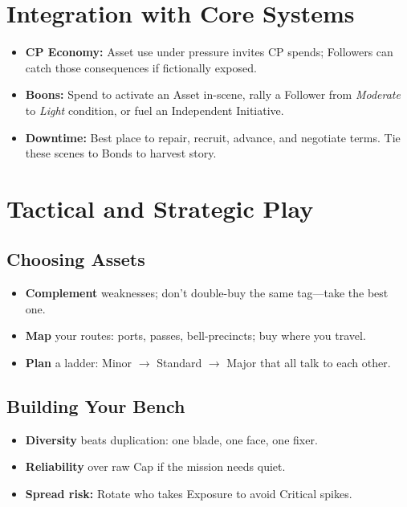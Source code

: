 \begin{multicols}{2}
\section{Integration with Core Systems}
\begin{itemize}
  \item \textbf{CP Economy:} Asset use under pressure invites CP spends; Followers can catch those consequences if fictionally exposed.
  \item \textbf{Boons:} Spend to activate an Asset in-scene, rally a Follower from \emph{Moderate} to \emph{Light} condition, or fuel an Independent Initiative.
  \item \textbf{Downtime:} Best place to repair, recruit, advance, and negotiate terms. Tie these scenes to Bonds to harvest story.
\end{itemize}

\section{Tactical and Strategic Play}
\subsection*{Choosing Assets}
\begin{itemize}
  \item \textbf{Complement} weaknesses; don’t double-buy the same tag—take the best one.
  \item \textbf{Map} your routes: ports, passes, bell-precincts; buy where you travel.
  \item \textbf{Plan} a ladder: Minor \(\rightarrow\) Standard \(\rightarrow\) Major that all talk to each other.
\end{itemize}

\subsection*{Building Your Bench}
\begin{itemize}
  \item \textbf{Diversity} beats duplication: one blade, one face, one fixer.
  \item \textbf{Reliability} over raw Cap if the mission needs quiet.
  \item \textbf{Spread risk:} Rotate who takes Exposure to avoid Critical spikes.
\end{itemize}


\end{multicols}
